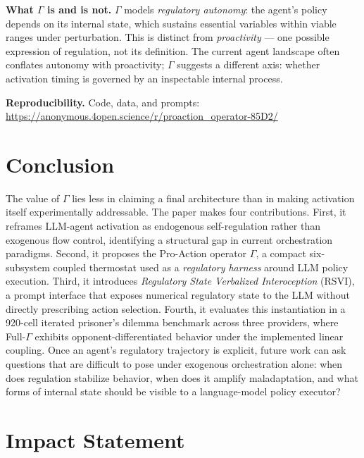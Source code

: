 \documentclass{article}
\begin{document}
\textbf{What $\Gamma$ is and is not.} $\Gamma$ models \emph{regulatory autonomy}: the agent's policy depends on its internal state, which sustains essential variables within viable ranges under perturbation. This is distinct from \emph{proactivity} --- one possible expression of regulation, not its definition. The current agent landscape often conflates autonomy with proactivity; $\Gamma$ suggests a different axis: whether activation timing is governed by an inspectable internal process.

\textbf{Reproducibility.} Code, data, and prompts: \url{https://anonymous.4open.science/r/proaction_operator-85D2/}

\section{Conclusion}

The value of $\Gamma$ lies less in claiming a final architecture than in making activation itself experimentally addressable. The paper makes four contributions. First, it reframes LLM-agent activation as endogenous self-regulation rather than exogenous flow control, identifying a structural gap in current orchestration paradigms. Second, it proposes the Pro-Action operator $\Gamma$, a compact six-subsystem coupled thermostat used as a \textit{regulatory harness} around LLM policy execution. Third, it introduces \textit{Regulatory State Verbalized Interoception} (RSVI), a prompt interface that exposes numerical regulatory state to the LLM without directly prescribing action selection. Fourth, it evaluates this instantiation in a 920-cell iterated prisoner's dilemma benchmark across three providers, where Full-$\Gamma$ exhibits opponent-differentiated behavior under the implemented linear coupling. Once an agent's regulatory trajectory is explicit, future work can ask questions that are difficult to pose under exogenous orchestration alone: when does regulation stabilize behavior, when does it amplify maladaptation, and what forms of internal state should be visible to a language-model policy executor?

\section*{Impact Statement}
\end{document}
